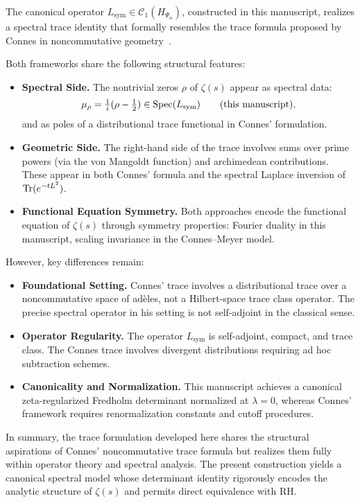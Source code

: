 
\begin{remark}
\label{rem:compare_to_connes_trace}

The canonical operator \( L_{\mathrm{sym}} \in \mathcal{C}_1(H_{\Psi_\alpha}) \), constructed in this manuscript, realizes a spectral trace identity that formally resembles the trace formula proposed by Connes in noncommutative geometry~\cite{Connes1999TraceFormula}.

Both frameworks share the following structural features:
\begin{itemize}
  \item \textbf{Spectral Side.} The nontrivial zeros \( \rho \) of \( \zeta(s) \) appear as spectral data:
  \[
  \mu_\rho = \tfrac{1}{i}(\rho - \tfrac{1}{2}) \in \operatorname{Spec}(L_{\mathrm{sym}}) \qquad \text{(this manuscript)},
  \]
  and as poles of a distributional trace functional in Connes’ formulation.
  
  \item \textbf{Geometric Side.} The right-hand side of the trace involves sums over prime powers (via the von Mangoldt function) and archimedean contributions. These appear in both Connes’ formula and the spectral Laplace inversion of \( \operatorname{Tr}(e^{-tL^2}) \).

  \item \textbf{Functional Equation Symmetry.} Both approaches encode the functional equation of \( \zeta(s) \) through symmetry properties: Fourier duality in this manuscript, scaling invariance in the Connes–Meyer model.
\end{itemize}

However, key differences remain:
\begin{itemize}
  \item \textbf{Foundational Setting.} Connes’ trace involves a distributional trace over a noncommutative space of adèles, not a Hilbert-space trace class operator. The precise spectral operator in his setting is not self-adjoint in the classical sense.
  
  \item \textbf{Operator Regularity.} The operator \( L_{\mathrm{sym}} \) is self-adjoint, compact, and trace class. The Connes trace involves divergent distributions requiring ad hoc subtraction schemes.

  \item \textbf{Canonicality and Normalization.} This manuscript achieves a canonical zeta-regularized Fredholm determinant normalized at \( \lambda = 0 \), whereas Connes’ framework requires renormalization constants and cutoff procedures.
\end{itemize}

In summary, the trace formulation developed here shares the structural aspirations of Connes’ noncommutative trace formula but realizes them fully within operator theory and spectral analysis. The present construction yields a canonical spectral model whose determinant identity rigorously encodes the analytic structure of \( \zeta(s) \) and permits direct equivalence with RH.
\end{remark}
